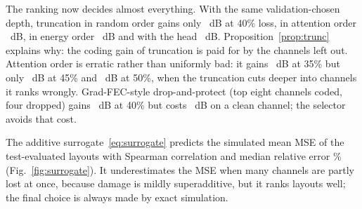 \documentclass[journal]{IEEEtran}
\begin{document}
The ranking now decides almost everything. With the same validation-chosen depth, truncation in random
order gains only \TruncRandomGainForty~dB at 40\% loss, in attention order \TruncAttentionGainForty~dB,
in energy order \TruncEnergyGainForty~dB and with the head \TruncHeadGainForty~dB.
Proposition~\ref{prop:trunc} explains why: the coding gain of truncation is paid for by the channels
left out. Attention order is erratic rather than uniformly bad: it gains \TruncAttentionGainThirtyFive~dB
at 35\% but only \TruncAttentionGainFortyFive~dB at 45\% and \TruncAttentionGainFifty~dB at 50\%, when
the truncation cuts deeper into channels it ranks wrongly. Grad-FEC-style drop-and-protect (top eight
channels coded, four dropped) gains \GradFecGainForty~dB at 40\% but costs \GradFecGainZero~dB on a
clean channel; the selector avoids that cost.

The additive surrogate~\eqref{eq:surrogate} predicts the simulated mean MSE of the test-evaluated layouts
with Spearman correlation \SurrogateSpearman{} and median relative error \SurrogateMedianRelErr\%
(Fig.~\ref{fig:surrogate}). It underestimates the MSE when many channels are partly lost at once, because
damage is mildly superadditive, but it ranks layouts well; the final choice is always made by exact
simulation.
\end{document}
